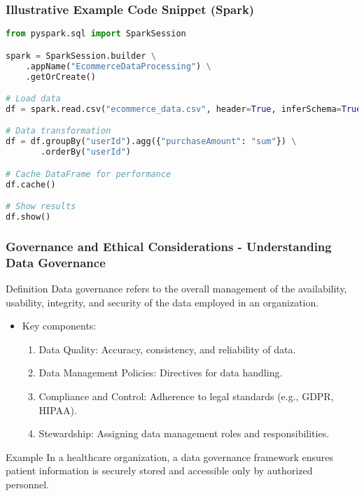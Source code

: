 \documentclass{beamer}
\begin{document}
\begin{frame}[fragile]
    \frametitle{Illustrative Example Code Snippet (Spark)}
    \begin{lstlisting}[language=Python]
from pyspark.sql import SparkSession

spark = SparkSession.builder \
    .appName("EcommerceDataProcessing") \
    .getOrCreate()

# Load data
df = spark.read.csv("ecommerce_data.csv", header=True, inferSchema=True)

# Data transformation
df = df.groupBy("userId").agg({"purchaseAmount": "sum"}) \
       .orderBy("userId")

# Cache DataFrame for performance
df.cache()

# Show results
df.show()
    \end{lstlisting}
\end{frame}

\begin{frame}[fragile]
    \frametitle{Governance and Ethical Considerations - Understanding Data Governance}
    \begin{block}{Definition}
        Data governance refers to the overall management of the availability, usability, integrity, and security of the data employed in an organization. 
    \end{block}
    
    \begin{itemize}
        \item Key components:
        \begin{enumerate}
            \item Data Quality: Accuracy, consistency, and reliability of data.
            \item Data Management Policies: Directives for data handling.
            \item Compliance and Control: Adherence to legal standards (e.g., GDPR, HIPAA).
            \item Stewardship: Assigning data management roles and responsibilities.
        \end{enumerate}
    \end{itemize}
    
    \begin{block}{Example}
        In a healthcare organization, a data governance framework ensures patient information is securely stored and accessible only by authorized personnel.
    \end{block}
\end{frame}
\end{document}
